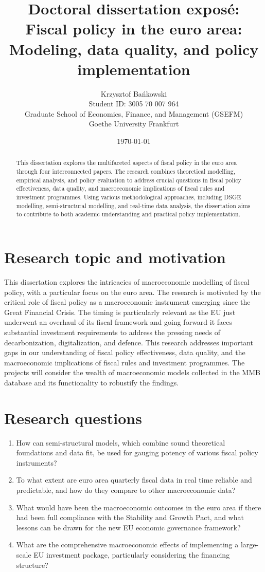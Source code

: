 \documentclass[11pt,a4paper]{article}
\title{\Large Doctoral dissertation exposé:\\[1em] 
       \huge\textbf{Fiscal policy in the euro area:\\
       Modeling, data quality, and policy implementation}}
\author{Krzysztof Bańkowski\\[0.5em]
        Student ID: 3005 70 007 964\\
        Graduate School of Economics, Finance, and Management (GSEFM)\\
        Goethe University Frankfurt}
\date{\today}
\begin{document}
\maketitle

\begin{abstract}
This dissertation explores the multifaceted aspects of fiscal policy in the euro area through four interconnected papers. The research combines theoretical modelling, empirical analysis, and policy evaluation to address crucial questions in fiscal policy effectiveness, data quality, and macroeconomic implications of fiscal rules and investment programmes. Using various methodological approaches, including DSGE modelling, semi-structural modelling, and real-time data analysis, the dissertation aims to contribute to both academic understanding and practical policy implementation.
\end{abstract}

\section*{Research topic and motivation}
This dissertation explores the intricacies of macroeconomic modelling of fiscal policy, with a particular focus on the euro area. The research is motivated by the critical role of fiscal policy as a macroeconomic instrument emerging since the Great Financial Crisis. The timing is particularly relevant as the EU just underwent an overhaul of its fiscal framework and going forward it faces substantial investment requirements to address the pressing needs of decarbonization, digitalization, and defence. This research addresses important gaps in our understanding of fiscal policy effectiveness, data quality, and the macroeconomic implications of fiscal rules and investment programmes. The projects will consider the wealth of macroeconomic models collected in the MMB database and its functionality to robustify the findings.

\section*{Research questions}
\begin{enumerate}[label=\textbf{RQ\arabic*.}, wide=0pt]
    \item How can semi-structural models, which combine sound theoretical foundations and data fit, be used for gauging potency of various fiscal policy instruments?
    \item To what extent are euro area quarterly fiscal data in real time reliable and predictable, and how do they compare to other macroeconomic data?
    \item What would have been the macroeconomic outcomes in the euro area if there had been full compliance with the Stability and Growth Pact, and what lessons can be drawn for the new EU economic governance framework?
    \item What are the comprehensive macroeconomic effects of implementing a large-scale EU investment package, particularly considering the financing structure?
\end{enumerate}
\end{document}
